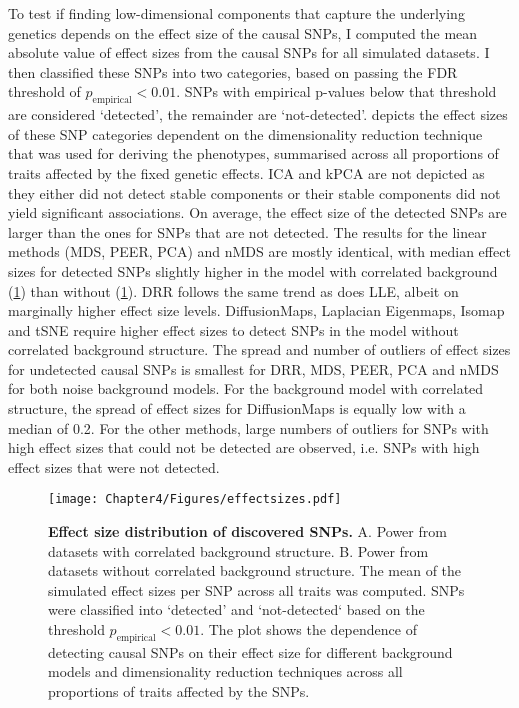 To test if finding low-dimensional components that capture the underlying genetics depends on the effect size of the causal SNPs, I computed the mean absolute value of effect sizes from the causal SNPs for all simulated datasets. I then classified these SNPs into two categories, based on passing the FDR threshold of \(p_\text{empirical} < 0.01\). SNPs with empirical p-values below that threshold are considered `detected', the remainder are `not-detected'.  depicts the effect sizes of these SNP categories dependent on the dimensionality reduction technique that was used for deriving the phenotypes, summarised across all proportions of traits affected by the fixed genetic effects. ICA and kPCA are not depicted as they either did not detect stable components or their stable components did not yield significant associations. On average, the effect size of the detected SNPs are larger than the ones for SNPs that are not detected. The results for the linear methods (MDS, PEER, PCA) and nMDS are mostly identical, with median effect sizes for detected SNPs slightly higher in the model with correlated background (\cref{fig:effectsizes-dimRed}) than without (\cref{fig:effectsizes-dimRed}). DRR follows the same trend as does LLE, albeit on marginally higher effect size levels. DiffusionMaps, Laplacian Eigenmaps, Isomap and tSNE require higher effect sizes to detect SNPs in the model without correlated background structure. The spread and number of outliers of effect sizes for undetected causal SNPs is smallest for DRR, MDS, PEER, PCA and nMDS for both noise background models. For the background model with correlated structure, the spread of effect sizes for DiffusionMaps is equally low with a median of \num{0.2}. For the other methods, large numbers of outliers for SNPs with high effect sizes that could not be detected are observed, i.e. SNPs with high effect sizes that were not detected.
%
\begin{figure}[hbtp]
	\centering
	\texttt{[image: Chapter4/Figures/effectsizes.pdf]}
	\caption[\textbf{Effect size distribution of discovered SNPs.}]{\textbf{Effect size distribution of discovered SNPs. } A. Power from datasets with correlated background structure. B. Power from datasets without correlated background structure. The mean of the simulated effect sizes per SNP across all traits was computed. SNPs were classified into `detected' and `not-detected` based on the threshold \(p_\text{empirical} < 0.01\). The plot shows the dependence of detecting causal SNPs on their effect size for different background models and dimensionality reduction techniques across all proportions of traits affected by the SNPs.} 
	 	\label{fig:effectsizes-dimRed}
\end{figure}
%
